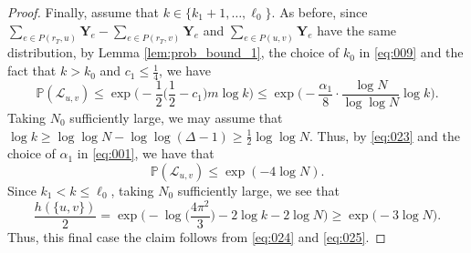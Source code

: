 \documentclass[10pt,a4paper]{amsart}
\begin{document}
\begin{proof}
Finally, assume that $k\in \{k_1+1,\dots,\ell_0\}$. As before, since
$\sum_{e\in P(r_T,u)}\mathbf{Y}_e - \sum_{e\in P(r_T,v)}\mathbf{Y}_e$ and
$\sum_{e\in P(u,v)}\mathbf{Y}_e $ have the same distribution, by Lemma \ref{lem:prob_bound_1},
the choice of $k_0$ in \eqref{eq:009} and the fact that $k>k_0$ and $c_1\leqslant\frac{1}{4}$, we have
\begin{equation}\label{eq:023}
\mathbb{P}(\mathcal{L}_{u,v}) \leqslant \exp\Big(-\frac{1}{2} \Big(\frac{1}{2}-c_1\Big)m\log k \Big)
\leqslant \exp\Big( -\frac{\alpha_1}{8} \cdot \frac{\log N}{\log\log N} \log k \Big).
\end{equation}
Taking $N_0$ sufficiently large, we may assume that
$\log k \geqslant \log \log N - \log\log(\Delta-1) \geqslant \frac{1}{2}\log\log N$.
Thus, by \eqref{eq:023} and the choice of $\alpha_1$ in \eqref{eq:001}, we have that
\begin{equation}\label{eq:024}
\mathbb{P}(\mathcal{L}_{u,v})\leqslant \exp( -4\log N).
\end{equation}
Since $k_1 < k \leqslant \ell_0$, taking $N_0$ sufficiently large, we see that
\begin{equation} \label{eq:025}
\frac{h(\{u,v\})}{2} = \exp\Big(-\log\Big(\frac{4\pi^2}{3}\Big) -2\log k -2\log N\Big)
\geqslant \exp\Big(- 3\log N \Big).
\end{equation}
Thus, this final case the claim follows from  \eqref{eq:024} and \eqref{eq:025}.
\end{proof}
\end{document}
